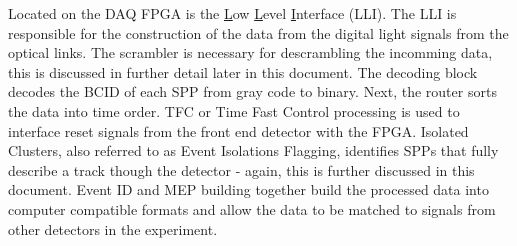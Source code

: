       Located on the DAQ FPGA is the \underline{L}ow \underline{L}evel \underline{I}nterface (LLI).
      The LLI is responsible for the construction of the data from the digital light signals from the optical links.
      The scrambler is necessary for descrambling the incomming data, this is discussed in further detail later in this document.
      The decoding block decodes the BCID of each SPP from gray code to binary.
      Next, the router sorts the data into time order.
      TFC or Time Fast Control processing is used to interface reset signals from the front end detector with the FPGA.
      Isolated Clusters, also referred to as Event Isolations Flagging, identifies SPPs that fully describe a track though the detector - again, this is further discussed in this document.
      Event ID and MEP building together build the processed data into computer compatible formats and allow the data to be matched to signals from other detectors in the experiment.